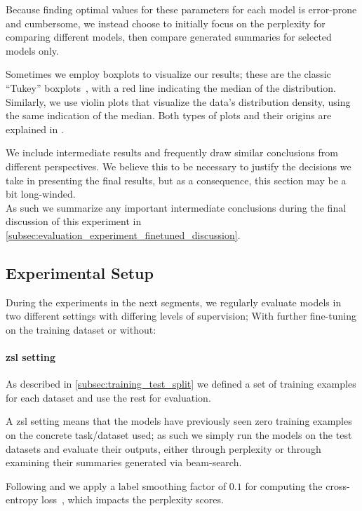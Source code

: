 Because finding optimal values for these parameters for each model is error-prone and cumbersome,
we instead choose to initially focus on the perplexity for comparing different models,
then compare generated summaries for selected models only.

Sometimes we employ boxplots to visualize our results;
these are the classic \enquote{Tukey} boxplots~\parencite{boxplots},
with a red line indicating the median of the distribution.
Similarly, we use violin plots that visualize the data's distribution density,
using the same indication of the median.
Both types of plots and their origins are explained in \parencite{boxplots}.

We include intermediate results and frequently draw similar conclusions from different perspectives.
We believe this to be necessary to justify the decisions we take in presenting the final results,
but as a consequence, this section may be a bit long-winded.\\
As such we summarize any important intermediate conclusions during the final discussion of this experiment in
\autoref{subsec:evaluation_experiment_finetuned_discussion}.

\subsection{Experimental Setup}

During the experiments in the next segments,
we regularly evaluate models in two different settings with differing levels of supervision;
With further fine-tuning on the training dataset or without:

\paragraph{\acf*{zsl} setting}

As described in \autoref{subsec:training_test_split}
we defined a set of training examples for each dataset and use the rest for evaluation.

A \acl{zsl} setting means that the models have previously seen zero training examples on the concrete task/dataset used;
as such we simply run the models on the test datasets and evaluate their outputs,
either through perplexity or through examining their summaries generated via beam-search.

Following \citeauthor*{bart} and \citeauthor*{pegasus} we apply a label smoothing factor of \(0.1\)
for computing the cross-entropy loss~\parencites[7876]{bart}[appendix]{pegasus},
which impacts the perplexity scores.

